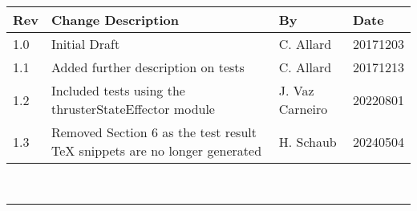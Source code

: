 \documentclass[]{BasiliskReportMemo}
\begin{document}
\makeCover

%
%
\pagestyle{empty}
{\renewcommand{\arraystretch}{2}
\noindent
\begin{longtable}{|p{0.5in}|p{3.5in}|p{1.07in}|p{0.9in}|}
\hline
{\bfseries Rev} & {\bfseries Change Description} & {\bfseries By}& {\bfseries Date} \\
\hline
1.0 & Initial Draft & C. Allard & 20171203\\
\hline
1.1 & Added further description on tests & C. Allard & 20171213\\
\hline
1.2 & Included tests using the thrusterStateEffector module & J. Vaz Carneiro & 20220801\\
\hline
1.3 & Removed Section 6 as the test result TeX snippets are no longer generated & H. Schaub & 20240504 \\
\hline
\end{longtable}
}



\newpage
\setcounter{page}{1}
\pagestyle{fancy}

\tableofcontents %
~\\ \hrule ~\\ %










	








\end{document}
